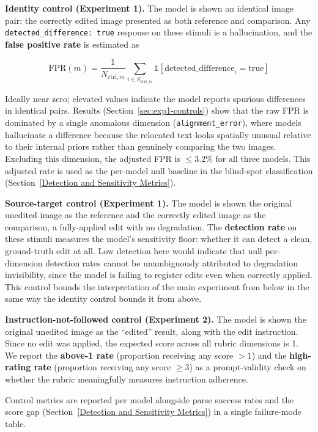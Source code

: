 \textbf{Identity control (Experiment 1).} The model is shown an identical image pair: the correctly edited image presented as both reference and comparison. Any \texttt{detected\_difference: true} response on these stimuli is a hallucination, and the \textbf{false positive rate} is estimated as

\[\text{FPR}(m) = \frac{1}{N_{\text{ctrl},m}} \sum_{i \in S_{\text{ctrl},m}} \mathbb{1}[\text{detected\_difference}_{i} = \text{true}]\]

Ideally near zero; elevated values indicate the model reports spurious differences in identical pairs. Results (Section~\ref{sec:exp1-controls}) show that the raw FPR is dominated by a single anomalous dimension (\texttt{alignment\_error}), where models hallucinate a difference because the relocated text looks spatially unusual relative to their internal priors rather than genuinely comparing the two images. Excluding this dimension, the adjusted FPR is $\leq 3.2\%$ for all three models. This adjusted rate is used as the per-model null baseline in the blind-spot classification (Section~\ref{Detection and Sensitivity Metrics}).

\textbf{Source-target control (Experiment 1).} The model is shown the original unedited image as the reference and the correctly edited image as the comparison, a fully-applied edit with no degradation. The \textbf{detection rate} on these stimuli measures the model's sensitivity floor: whether it can detect a clean, ground-truth edit at all. Low detection here would indicate that null per-dimension detection rates cannot be unambiguously attributed to degradation invisibility, since the model is failing to register edits even when correctly applied. This control bounds the interpretation of the main experiment from below in the same way the identity control bounds it from above.

\textbf{Instruction-not-followed control (Experiment 2).} The model is shown the original unedited image as the ``edited'' result, along with the edit instruction. Since no edit was applied, the expected score across all rubric dimensions is 1. We report the \textbf{above-1 rate} (proportion receiving any score $> 1$) and the \textbf{high-rating rate} (proportion receiving any score $\geq 3$) as a prompt-validity check on whether the rubric meaningfully measures instruction adherence.

Control metrics are reported per model alongside parse success rates and the score gap (Section~\ref{Detection and Sensitivity Metrics}) in a single failure-mode table.

